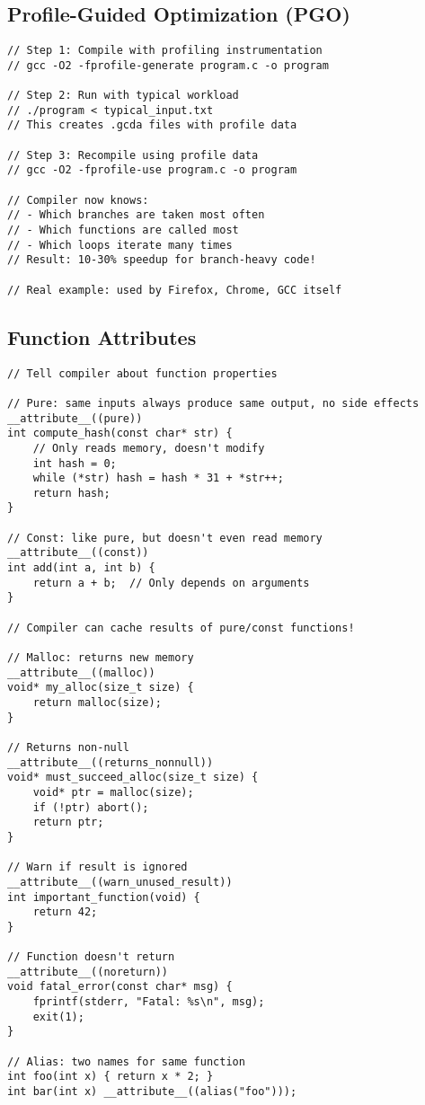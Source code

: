 \subsection{Profile-Guided Optimization (PGO)}

\begin{lstlisting}
// Step 1: Compile with profiling instrumentation
// gcc -O2 -fprofile-generate program.c -o program

// Step 2: Run with typical workload
// ./program < typical_input.txt
// This creates .gcda files with profile data

// Step 3: Recompile using profile data
// gcc -O2 -fprofile-use program.c -o program

// Compiler now knows:
// - Which branches are taken most often
// - Which functions are called most
// - Which loops iterate many times
// Result: 10-30% speedup for branch-heavy code!

// Real example: used by Firefox, Chrome, GCC itself
\end{lstlisting}

\subsection{Function Attributes}

\begin{lstlisting}
// Tell compiler about function properties

// Pure: same inputs always produce same output, no side effects
__attribute__((pure))
int compute_hash(const char* str) {
    // Only reads memory, doesn't modify
    int hash = 0;
    while (*str) hash = hash * 31 + *str++;
    return hash;
}

// Const: like pure, but doesn't even read memory
__attribute__((const))
int add(int a, int b) {
    return a + b;  // Only depends on arguments
}

// Compiler can cache results of pure/const functions!

// Malloc: returns new memory
__attribute__((malloc))
void* my_alloc(size_t size) {
    return malloc(size);
}

// Returns non-null
__attribute__((returns_nonnull))
void* must_succeed_alloc(size_t size) {
    void* ptr = malloc(size);
    if (!ptr) abort();
    return ptr;
}

// Warn if result is ignored
__attribute__((warn_unused_result))
int important_function(void) {
    return 42;
}

// Function doesn't return
__attribute__((noreturn))
void fatal_error(const char* msg) {
    fprintf(stderr, "Fatal: %s\n", msg);
    exit(1);
}

// Alias: two names for same function
int foo(int x) { return x * 2; }
int bar(int x) __attribute__((alias("foo")));
\end{lstlisting}

